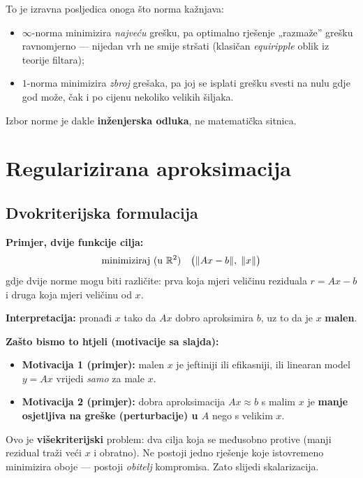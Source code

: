 \begin{napomena}
To je izravna posljedica onoga što norma kažnjava:
\begin{itemize}
  \item $\infty$-norma minimizira \emph{najveću} grešku, pa optimalno rješenje
        „razmaže” grešku ravnomjerno --- nijedan vrh ne smije stršati (klasičan
        \emph{equiripple} oblik iz teorije filtara);
  \item $1$-norma minimizira \emph{zbroj} grešaka, pa joj se isplati grešku
        svesti na nulu gdje god može, čak i po cijenu nekoliko velikih šiljaka.
\end{itemize}
Izbor norme je dakle \textbf{inženjerska odluka}, ne matematička sitnica.
\end{napomena}

\section{Regularizirana aproksimacija}
\label{sec:regularizacija}

\subsection{Dvokriterijska formulacija}

\textbf{Primjer, dvije funkcije cilja:}
\[
\text{minimiziraj (u } \mathbb{R}^2\text{)} \quad
\big(\|Ax-b\|,\; \|x\|\big)
\]
gdje dvije norme mogu biti različite: prva koja mjeri veličinu reziduala
$r = Ax - b$ i druga koja mjeri veličinu od $x$.

\textbf{Interpretacija:} pronađi $x$ tako da $Ax$ dobro aproksimira $b$, uz to
da je $x$ \textbf{malen}.

\textbf{Zašto bismo to htjeli (motivacije sa slajda):}

\begin{itemize}
  \item \textbf{Motivacija 1 (primjer):} malen $x$ je jeftiniji ili efikasniji,
        ili linearan model $y = Ax$ vrijedi \emph{samo} za male $x$.
  \item \textbf{Motivacija 2 (primjer):} dobra aproksimacija $Ax \approx b$ s
        malim $x$ je \textbf{manje osjetljiva na greške (perturbacije) u $A$}
        nego s velikim $x$.
\end{itemize}

\begin{napomena}
Ovo je \textbf{višekriterijski} problem: dva cilja koja se međusobno protive
(manji rezidual traži veći $x$ i obratno). Ne postoji jedno rješenje koje
istovremeno minimizira oboje --- postoji \emph{obitelj} kompromisa. Zato slijedi
skalarizacija.
\end{napomena}


